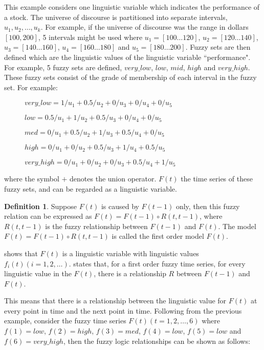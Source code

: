 \documentclass{article}
\theoremstyle{definition}
\newtheorem{ftsdef}{Definition}
\begin{document}
This example considers one linguistic variable which indicates the performance of a stock. The universe of discourse is partitioned into separate intervals, $u_1, u_2,\ldots,u_k$. For example, if the universe of discourse was the range in dollars $[100, 200]$, 5 intervals might be used where $u_1 = [100 \ldots 120]$, $u_2 = [120 \ldots 140]$, $u_3 = [140 \ldots 160]$, $u_4 = [160 \ldots 180]$ and $u_5 = [180 \ldots 200]$. Fuzzy sets are then defined which are the linguistic values of the linguistic variable ``performance". For example, 5 fuzzy sets are defined, $very\_low$, $low$, $mid$, $high$ and $very\_high$. These fuzzy sets consist of the grade of membership of each interval in the fuzzy set. For example:
\begin{description}
\item[] $very\_low = 1/u_1 + 0.5/u_2 + 0/u_3 + 0/u_4 + 0/u_5$
\item[] $low = 0.5/u_1 + 1/u_2 + 0.5/u_3 + 0/u_4 + 0/u_5$
\item[] $med = 0/u_1 + 0.5/u_2 + 1/u_3 + 0.5/u_4 + 0/u_5$
\item[] $high = 0/u_1 + 0/u_2 + 0.5/u_3 + 1/u_4 + 0.5/u_5$
\item[] $very\_high = 0/u_1 + 0/u_2 + 0/u_3 + 0.5/u_4 + 1/u_5$
\end{description}
where the symbol $+$ denotes the union operator. $F(t)$ the time series of these fuzzy sets, and can be regarded as a linguistic variable.

\begin{ftsdef}
\label{def2}
Suppose $F(t)$ is caused by $F(t-1)$ only, then this fuzzy relation can be expressed as $F(t)=F(t-1) \circ R(t,t-1)$, where $R(t,t-1)$ is the fuzzy relationship between $F(t-1)$ and $F(t)$. The model $F(t)=F(t-1) \circ R(t,t-1)$ is called the first order model $F(t)$.
\end{ftsdef}

 shows that $F(t)$ is a linguistic variable with linguistic values $f_i(t) (i=1,2,\ldots)$.  states that, for a first order fuzzy time series, for every linguistic value in the $F(t)$, there is a relationship $R$ between $F(t-1)$ and $F(t)$. 

This means that there is a relationship between the linguistic value for $F(t)$ at every point in time and the next point in time. Following from the previous example, consider the fuzzy time series $F(t)(t=1,2,\ldots,6)$ where $f(1)=low$, $f(2)=high$, $f(3)=med$, $f(4)=low$, $f(5)=low$ and $f(6)=very\_high$, then the fuzzy logic relationships can be shown as follows: 
\end{document}
